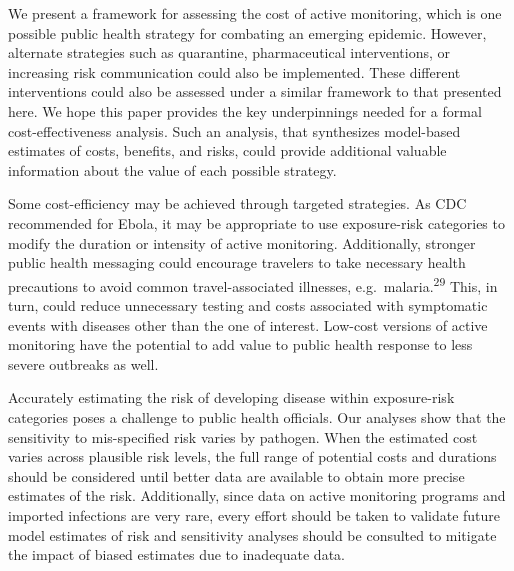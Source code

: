 \documentclass[]{article}
\begin{document}
We present a framework for assessing the cost of active monitoring,
which is one possible public health strategy for combating an emerging
epidemic. However, alternate strategies such as quarantine,
pharmaceutical interventions, or increasing risk communication could
also be implemented. These different interventions could also be
assessed under a similar framework to that presented here. We hope this
paper provides the key underpinnings needed for a formal
cost-effectiveness analysis. Such an analysis, that synthesizes
model-based estimates of costs, benefits, and risks, could provide
additional valuable information about the value of each possible
strategy.

Some cost-efficiency may be achieved through targeted strategies. As CDC
recommended for Ebola, it may be appropriate to use exposure-risk
categories to modify the duration or intensity of active monitoring.
Additionally, stronger public health messaging could encourage travelers
to take necessary health precautions to avoid common travel-associated
illnesses, e.g.~malaria.\textsuperscript{29} This, in turn, could reduce
unnecessary testing and costs associated with symptomatic events with
diseases other than the one of interest. Low-cost versions of active
monitoring have the potential to add value to public health response to
less severe outbreaks as well.

Accurately estimating the risk of developing disease within
exposure-risk categories poses a challenge to public health officials.
Our analyses show that the sensitivity to mis-specified risk varies by
pathogen. When the estimated cost varies across plausible risk levels,
the full range of potential costs and durations should be considered
until better data are available to obtain more precise estimates of the
risk. Additionally, since data on active monitoring programs and
imported infections are very rare, every effort should be taken to
validate future model estimates of risk and sensitivity analyses should
be consulted to mitigate the impact of biased estimates due to
inadequate data.
\end{document}
